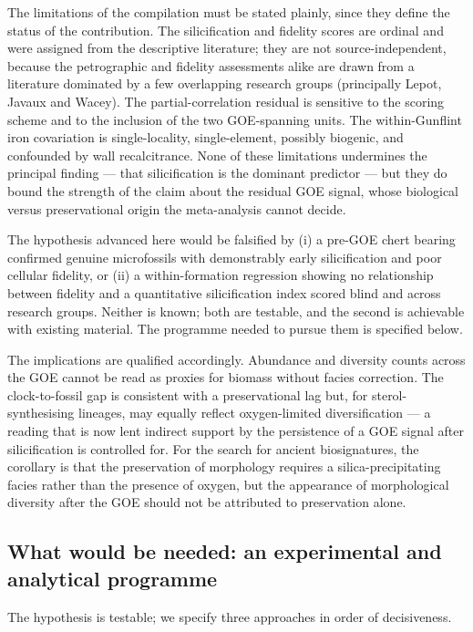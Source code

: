 \documentclass[11pt]{article}
\begin{document}
The limitations of the compilation must be stated plainly, since they define the status of the
contribution. The silicification and fidelity scores are ordinal and were assigned from the
descriptive literature; they are not source-independent, because the petrographic and fidelity
assessments alike are drawn from a literature dominated by a few overlapping research groups
(principally Lepot, Javaux and Wacey). The partial-correlation residual is sensitive to the scoring
scheme and to the inclusion of the two GOE-spanning units. The within-Gunflint iron covariation is
single-locality, single-element, possibly biogenic, and confounded by wall recalcitrance. None of
these limitations undermines the principal finding --- that silicification is the dominant predictor
--- but they do bound the strength of the claim about the residual GOE signal, whose biological
versus preservational origin the meta-analysis cannot decide.

The hypothesis advanced here would be falsified by (i) a pre-GOE chert bearing confirmed genuine
microfossils with demonstrably early silicification and poor cellular fidelity, or (ii) a
within-formation regression showing no relationship between fidelity and a quantitative
silicification index scored blind and across research groups. Neither is known; both are testable,
and the second is achievable with existing material. The programme needed to pursue them is
specified below.

The implications are qualified accordingly. Abundance and diversity counts across the GOE cannot be
read as proxies for biomass without facies correction. The clock-to-fossil gap is consistent with a
preservational lag but, for sterol-synthesising lineages, may equally reflect oxygen-limited
diversification --- a reading that is now lent indirect support by the persistence of a GOE signal
after silicification is controlled for. For the search for ancient biosignatures, the corollary is
that the preservation of morphology requires a silica-precipitating facies rather than the presence
of oxygen, but the appearance of morphological diversity after the GOE should not be attributed to
preservation alone.

\subsection{What would be needed: an experimental and analytical programme}

The hypothesis is testable; we specify three approaches in order of decisiveness.
\end{document}
